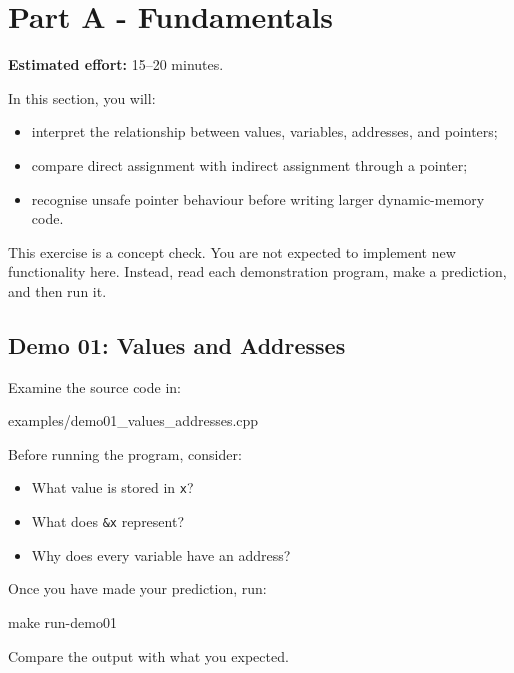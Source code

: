 \documentclass{csc2059practical}
\begin{document}
\section{Part A - Fundamentals}


\begin{infobox}
\textbf{Estimated effort:} 15--20 minutes.
\end{infobox}

\begin{learningoutcomes}
In this section, you will:
\begin{itemize}
  \item interpret the relationship between values, variables, addresses, and pointers;
  \item compare direct assignment with indirect assignment through a pointer;
  \item recognise unsafe pointer behaviour before writing larger dynamic-memory code.
\end{itemize}
\end{learningoutcomes}

This exercise is a concept check. You are not expected to implement new functionality here. Instead, read each demonstration program, make a prediction, and then run it.

\subsection{Demo 01: Values and Addresses}

Examine the source code in:

\begin{terminal}
examples/demo01_values_addresses.cpp
\end{terminal}

Before running the program, consider:
\begin{itemize}
  \item What value is stored in \texttt{x}?
  \item What does \texttt{\&x} represent?
  \item Why does every variable have an address?
\end{itemize}

Once you have made your prediction, run:

\begin{bashcode}
make run-demo01
\end{bashcode}

Compare the output with what you expected.
\end{document}
